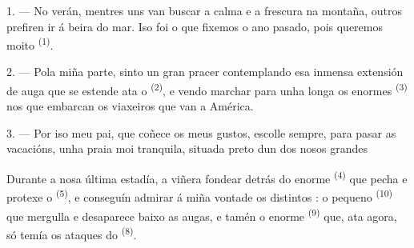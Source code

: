 %
%
%

\VUsaut{4.0mm}
\VUsaut{3.0mm}
\VUsaut{3.0mm}

1. --- No verán, mentres uns van buscar a calma e a frescura na montaña, outros
prefiren ir á beira do mar. Iso foi o que fixemos o ano pasado, pois queremos moito
 \textsuperscript{(1)}.

2. --- Pola miña parte, sinto un gran pracer contemplando esa inmensa extensión de auga
que se estende ata o  \textsuperscript{(2)}, e vendo marchar para
unha longa  os enormes  \textsuperscript{(3)} nos que
embarcan os viaxeiros que van a América.

3. --- Por iso meu pai, que coñece os meus gustos, escolle sempre, para pasar as
vacacións, unha praia moi tranquila, situada preto dun dos nosos grandes

Durante a nosa última estadía, a  viñera fondear detrás do enorme
 \textsuperscript{(4)} que pecha e protexe o 
\textsuperscript{(5)}, e conseguín admirar á miña vontade os distintos : o pequeno  \textsuperscript{(10)} que mergulla e
desaparece baixo as augas, e tamén o enorme 
\textsuperscript{(9)} que, ata agora, só temía os ataques do 
\textsuperscript{(8)}.

